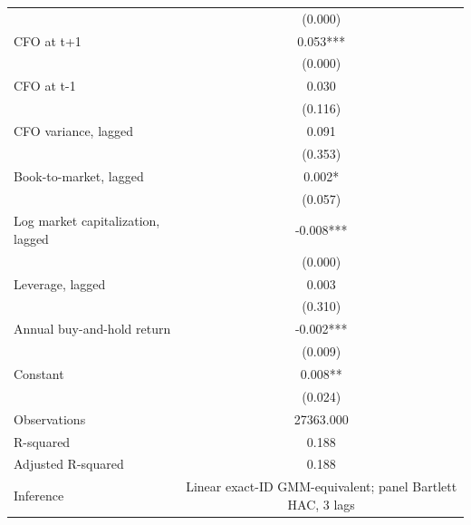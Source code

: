 {\begin{tabular}{l*{1}{c}}
                    &     (0.000)   \\
CFO at t+1          &       0.053***\\
                    &     (0.000)   \\
CFO at t-1          &       0.030   \\
                    &     (0.116)   \\
CFO variance, lagged&       0.091   \\
                    &     (0.353)   \\
Book-to-market, lagged&       0.002*  \\
                    &     (0.057)   \\
Log market capitalization, lagged&      -0.008***\\
                    &     (0.000)   \\
Leverage, lagged    &       0.003   \\
                    &     (0.310)   \\
Annual buy-and-hold return&      -0.002***\\
                    &     (0.009)   \\
Constant            &       0.008** \\
                    &     (0.024)   \\
\hline
Observations        &   27363.000   \\
R-squared           &       0.188   \\
Adjusted R-squared  &       0.188   \\
Inference           &Linear exact-ID GMM-equivalent; panel Bartlett HAC, 3 lags   \\
\hline\hline
\end{tabular}
}
